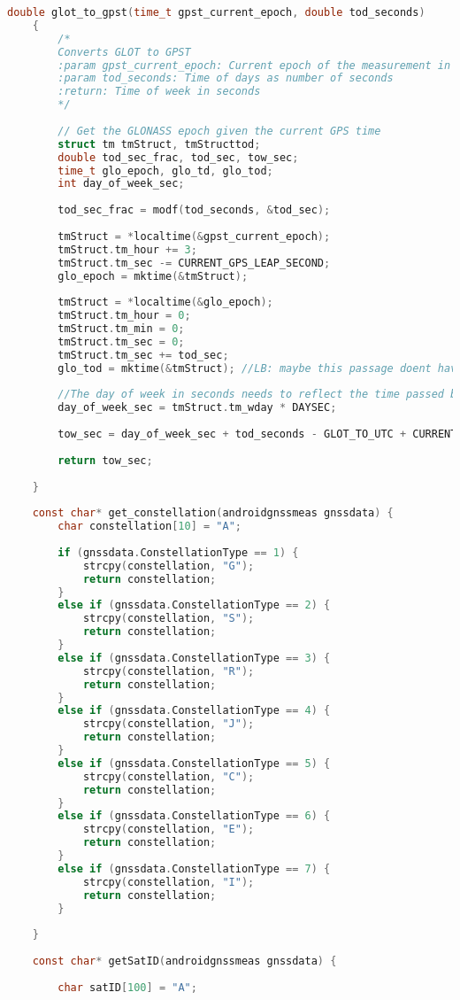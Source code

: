 \begin{lstlisting}[language=c]
	double glot_to_gpst(time_t gpst_current_epoch, double tod_seconds)
	{
		/*
		Converts GLOT to GPST
		:param gpst_current_epoch: Current epoch of the measurement in GPST
		:param tod_seconds: Time of days as number of seconds
		:return: Time of week in seconds
		*/
		
		// Get the GLONASS epoch given the current GPS time
		struct tm tmStruct, tmStructtod;
		double tod_sec_frac, tod_sec, tow_sec;
		time_t glo_epoch, glo_td, glo_tod;
		int day_of_week_sec;
		
		tod_sec_frac = modf(tod_seconds, &tod_sec);
		
		tmStruct = *localtime(&gpst_current_epoch);
		tmStruct.tm_hour += 3;
		tmStruct.tm_sec -= CURRENT_GPS_LEAP_SECOND;
		glo_epoch = mktime(&tmStruct);
		
		tmStruct = *localtime(&glo_epoch);
		tmStruct.tm_hour = 0;
		tmStruct.tm_min = 0;
		tmStruct.tm_sec = 0;
		tmStruct.tm_sec += tod_sec;
		glo_tod = mktime(&tmStruct); //LB: maybe this passage doent have sense
		
		//The day of week in seconds needs to reflect the time passed before the current day starts
		day_of_week_sec = tmStruct.tm_wday * DAYSEC;
		
		tow_sec = day_of_week_sec + tod_seconds - GLOT_TO_UTC + CURRENT_GPS_LEAP_SECOND;
		
		return tow_sec;
		
	}
	
	const char* get_constellation(androidgnssmeas gnssdata) {
		char constellation[10] = "A";
		
		if (gnssdata.ConstellationType == 1) {
			strcpy(constellation, "G");
			return constellation;
		}
		else if (gnssdata.ConstellationType == 2) {
			strcpy(constellation, "S");
			return constellation;
		}
		else if (gnssdata.ConstellationType == 3) {
			strcpy(constellation, "R");
			return constellation;
		}
		else if (gnssdata.ConstellationType == 4) {
			strcpy(constellation, "J");
			return constellation;
		}
		else if (gnssdata.ConstellationType == 5) {
			strcpy(constellation, "C");
			return constellation;
		}
		else if (gnssdata.ConstellationType == 6) {
			strcpy(constellation, "E");
			return constellation;
		}
		else if (gnssdata.ConstellationType == 7) {
			strcpy(constellation, "I");
			return constellation;
		}
		
	}
	
	const char* getSatID(androidgnssmeas gnssdata) {
		
		char satID[100] = "A";
		

\end{lstlisting}
